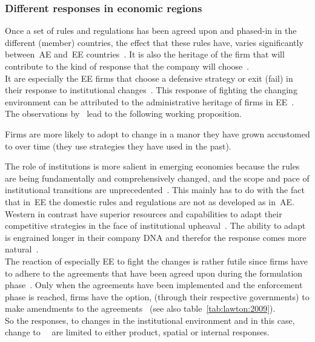 \subsubsection{Different responses in economic regions}
Once a set of rules and regulations has been agreed upon and phased-in in the different (member) countries, the effect that these rules have, varies significantly between~\gls{AE} and~\gls{EE} countries~\citep{Seligman:2008,Shenkar:2006}. 
It is also the heritage of the firm that will contribute to the kind of response that the company will choose~\citep{Carney:2003un}.\\
It are especially the \gls{EE} firms that choose a defensive strategy or exit (fail) in their response to institutional changes~\citep{Chittoor:2008cj}.
This response of fighting the changing environment can be attributed to the administrative heritage of firms in \gls{EE}~\citep{Bartlett:1989vl,Carney:2003un}.\\
The observations by~\citep{Bartlett:1989vl,Carney:2003un,Chittoor:2008cj} lead to the following working 
proposition.

 \begin{WP}\label{WP:history}
 Firms are more likely to adopt to change in a manor they have grown accustomed to over time (they use strategies they have used in the past).
\end{WP}
The role of institutions is more salient in emerging economies because the rules are being fundamentally and comprehensively changed, and the scope and pace of institutional transitions are unprecedented~\citep{Peng:2003uh}.
This mainly has to do with the fact that in~\gls{EE} the domestic rules and regulations are not as developed as in~\gls{AE}. 
Western \mne in contrast have superior resources and capabilities to adapt their competitive strategies in the face of institutional upheaval~\citep{Chittoor:2008cj,Newman:2000fc,Prahalad:2003th}. 
The ability to adapt is engrained longer in their company DNA and therefor the response comes more natural~\citep{Chittoor:2009jh}.\\
The reaction of especially \gls{EE} \mne to fight the changes is rather futile since firms have to adhere to the agreements that have been agreed upon during the formulation phase~\citep{Lawton:2005wo}.
Only when the agreements have been implemented and the enforcement phase is reached, firms have the option, (through their respective governments) to make amendments to the agreements~\citep{Lawton:2005wo} (see also table~\ref{tab:lawton:2009}).\\
So the responses, to changes in the institutional environment and in this case, change to \wto~\rr~are limited to either product, spatial or internal responses.\\

